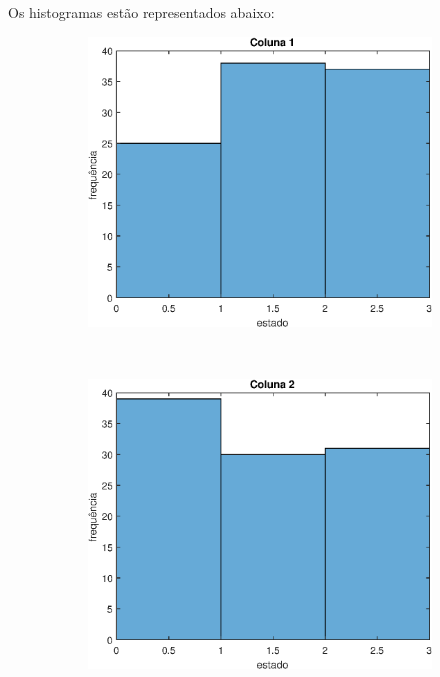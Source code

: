 \documentclass[12pt]{article}
\newenvironment{exercise}[2][Exercício]{\begin{trivlist}
\item[\hskip \labelsep {\bfseries #1}\hskip \labelsep {\bfseries #2.}]}{\end{trivlist}}
\begin{document}
\begin{exercise}{1.d} Os histogramas estão representados abaixo:

\begin{figure}[H]
    \centering
    \begin{subfigure}[b]{0.45\textwidth}
        \includegraphics[width=\textwidth]{figs/ex1_1.eps}
    \end{subfigure}
    ~ 
    \begin{subfigure}[b]{0.45\textwidth}
        \includegraphics[width=\textwidth]{figs/ex1_2.eps}
    \end{subfigure}
\end{figure}


\end{exercise}
\end{document}
